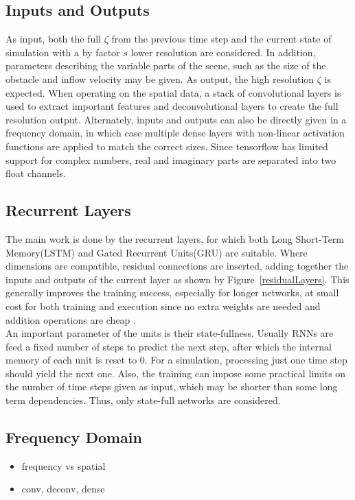 \documentclass[sigconf]{acmart}
\begin{document}
\subsection{Inputs and Outputs}
As input, both the full $\zeta$ from the previous time step and the current state of simulation with a by factor $s$ lower resolution are considered. 
In addition, parameters describing the variable parts of the scene, such as the size of the obstacle and inflow velocity may be given.
As output, the high resolution $\zeta$ is expected.
When operating on the spatial data, a stack of convolutional layers is used to extract important features and deconvolutional layers to create the full resolution output. Alternately, inputs and outputs can also be directly given in a frequency domain, in which case multiple dense layers with non-linear activation functions are applied to match the correct sizes. Since tensorflow has limited support for complex numbers, real and imaginary parts are separated into two float channels.
\subsection{Recurrent Layers}
The main work is done by the recurrent layers, for which both Long Short-Term Memory(LSTM) and Gated Recurrent Units(GRU) are suitable. Where dimensions are compatible, residual connections are inserted, adding together the inputs and outputs of the current layer as shown by Figure~\ref{residualLayers}. This generally improves the training success, especially for longer networks, at small cost for both training and execution since no extra weights are needed and addition operations are cheap \cite{he2016deep}. \\
An important parameter of the units is their state-fullness. Usually RNNs are feed a fixed number of steps to predict the next step, after which the internal memory of each unit is reset to $0$. For a simulation, processing just one time step should yield the next one. Also, the training can impose some practical limits on the number of time steps given as input, which may be shorter than some long term dependencies. Thus, only state-full networks are considered.
\subsection{Frequency Domain}
\begin{itemize}
	\item frequency vs spatial
	\item conv, deconv, dense
\end{itemize}
\end{document}
